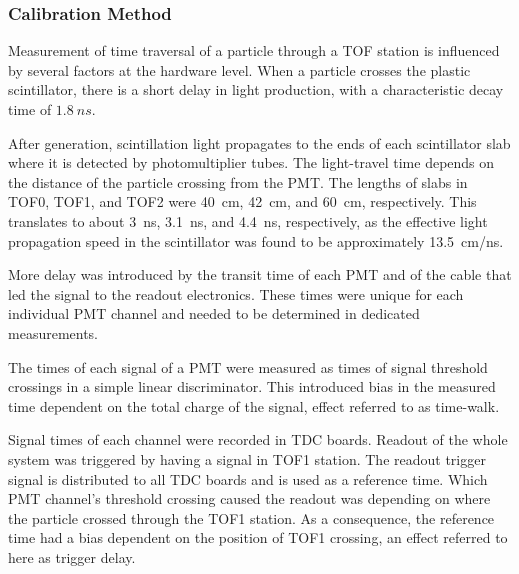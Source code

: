 \subsubsection{Calibration Method}

Measurement of time traversal of a particle through a TOF station is
influenced by several factors at the hardware level. When a particle
crosses the plastic scintillator, there is a short delay in light
production, with a characteristic decay time of $1.8~ns$.

After generation, scintillation light propagates to the ends of each
scintillator slab where it is detected by photomultiplier tubes. The
light-travel time depends on the distance of the particle crossing
from the PMT. The lengths of slabs in TOF0, TOF1, and TOF2 were 40~cm,
42~cm, and 60~cm, respectively. This translates to about 3~ns, 3.1~ns,
and 4.4~ns, respectively, as the effective light propagation speed in
the scintillator was found to be approximately 13.5~cm/ns.

More delay was introduced by the transit time of each PMT and of the
cable that led the signal to the readout electronics. These times were
unique for each individual PMT channel and needed to be determined in
dedicated measurements.

The times of each signal of a PMT were measured as times of signal threshold
crossings in a simple linear discriminator. This introduced bias in
the measured time dependent on the total charge of the signal, effect
referred to as time-walk.

Signal times of each channel were recorded in TDC boards. Readout of
the whole system was triggered by having a signal in TOF1 station. The
readout trigger signal is distributed to all TDC boards and is used as
a reference time. Which PMT channel's threshold crossing caused the
readout was depending on where the particle crossed through the TOF1
station. As a consequence, the reference time had a bias dependent on
the position of TOF1 crossing, an effect referred to here as trigger
delay.

